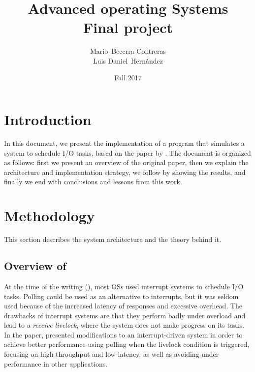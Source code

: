 \documentclass{article}
\begin{document}

\title{Advanced operating Systems \\ Final project}

\author{Mario~Becerra Contreras \\ Luis Daniel~Hernández}

\date{Fall 2017}


\maketitle

\section{Introduction}

In this document, we present the implementation of a program that simulates a system to schedule I/O tasks, based on the \citeyear{mogul1997eliminating} paper  by \citeauthor{mogul1997eliminating} \cite{mogul1997eliminating}. The document is organized as follows: first we present an overview of the original paper, then we explain the architecture and implementation strategy, we follow by showing the results, and finally we end with conclusions and lessons from this work.


\section{Methodology}

This section describes the system architecture and the theory behind it.

\subsection{Overview of }

At the time of the writing (\citeyear{mogul1997eliminating}), most OSs used interrupt systems to schedule I/O tasks. Polling could be used as an alternative to interrupts, but it was seldom used because of the increased latency of responses and excessive overhead. The drawbacks of interrupt systems are that they perform badly under overload and lead to a \textit{receive livelock}, where the system does not make progress on its tasks. In the paper, \citeauthor{mogul1997eliminating} presented modifications to an interrupt-driven system in order to achieve better performance using polling when the livelock condition is triggered, focusing on high throughput and low latency, as well as avoiding under-performance in other applications.
\end{document}
